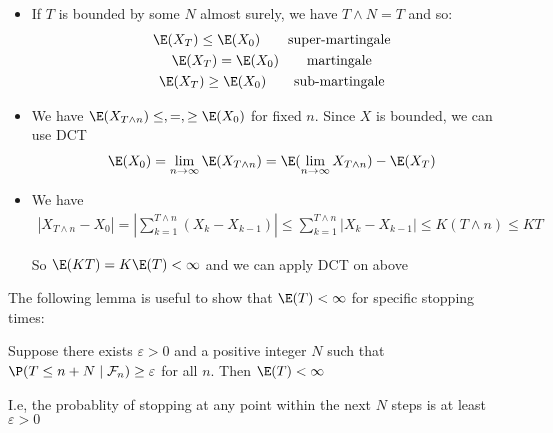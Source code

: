 \par\bigskip
\begin{prf}{}
  \begin{itemize}
    \item If $T$ is bounded by some $N$ almost surely, we have $T\wedge N = T$ and so:
      \begin{equation*}
        \begin{gathered}
          \E(X_T) \leq \E(X_0)\qquad\text{super-martingale}\\
          \E(X_T) = \E(X_0)\qquad\text{martingale}\\
          \E(X_T) \geq \E(X_0)\qquad\text{sub-martingale}
        \end{gathered}
      \end{equation*}
      \par\bigskip
    \item We have $\E(X_{T\wedge n}) \leq,=,\geq \E(X_0)$ for fixed $n$. Since $X$ is bounded, we can use DCT
      \begin{equation*}
        \begin{gathered}
          \E(X_0) = \lim_{n\to\infty}\E(X_{T\wedge n}) = \E(\lim_{n\to\infty}X_{T\wedge n}) - \E(X_T)
        \end{gathered}
      \end{equation*}
      \par\bigskip
    \item We have
      \begin{equation*}
        \begin{gathered}
          \left|X_{T\wedge n}-X_0\right| = \left|\sum_{k=1}^{T\wedge n}(X_k-X_{k-1})\right|\leq \sum_{k=1}^{T\wedge n}\left|X_k-X_{k-1}\right|\leq K(T\wedge n)\leq KT
        \end{gathered}
      \end{equation*}\par
      \noindent So $\E(KT) = K\E(T)<\infty$ and we can apply DCT on above
  \end{itemize}
\end{prf}
\par\bigskip
\noindent The following lemma is useful to show that $\E(T)<\infty$ for specific stopping times:
\par\bigskip
\begin{lem}[]{}
  Suppose there exists $\varepsilon>0$ and a positive integer $N$ such that $\P(T\leq n+N\mid\mathcal{F}_n)\geq\varepsilon$ for all $n$. Then $\E(T)<\infty$
  \par\bigskip
  \noindent I.e, the probablity of stopping at any point within the next $N$ steps is at least $\varepsilon>0$
\end{lem}
